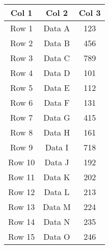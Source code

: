 \documentclass{article}
\begin{document}
\noindent

\setlength{\tabcolsep}{6pt}

\begin{longtable}[]{@{}ccc@{}}
\toprule
\textbf{Col 1} & \textbf{Col 2} & \textbf{Col 3} \\
\midrule
\endhead %
\bottomrule
\endfoot %
Row 1 & Data A & 123 \\
Row 2 & Data B & 456 \\
Row 3 & Data C & 789 \\
Row 4 & Data D & 101 \\
Row 5 & Data E & 112 \\
Row 6 & Data F & 131 \\
Row 7 & Data G & 415 \\
Row 8 & Data H & 161 \\
Row 9 & Data I & 718 \\
Row 10 & Data J & 192 \\
Row 11 & Data K & 202 \\
Row 12 & Data L & 213 \\
Row 13 & Data M & 224 \\
Row 14 & Data N & 235 \\
Row 15 & Data O & 246 \\
\end{longtable}
\end{document}
